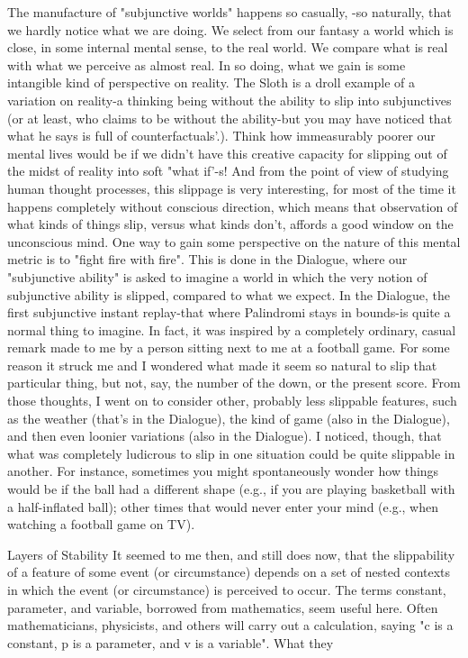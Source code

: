         The manufacture of "subjunctive worlds" happens so casually, -so naturally, that
we hardly notice what we are doing. We select from our fantasy a world which is close,
in some internal mental sense, to the real world. We compare what is real with what we
perceive as almost real. In so doing, what we gain is some intangible kind of perspective
on reality. The Sloth is a droll example of a variation on reality-a thinking being without
the ability to slip into subjunctives (or at least, who claims to be without the ability-but
you may have noticed that what he says is full of counterfactuals'.). Think how
immeasurably poorer our mental lives would be if we didn't have this creative capacity
for slipping out of the midst of reality into soft "what if'-s! And from the point of view of
studying human thought processes, this slippage is very interesting, for most of the time it
happens completely without conscious direction, which means that observation of what
kinds of things slip, versus what kinds don't, affords a good window on the unconscious
mind.
        One way to gain some perspective on the nature of this mental metric is to "fight
fire with fire". This is done in the Dialogue, where our "subjunctive ability" is asked to
imagine a world in which the very notion of
subjunctive ability is slipped, compared to what we expect. In the Dialogue, the first
subjunctive instant replay-that where Palindromi stays in bounds-is quite a normal thing
to imagine. In fact, it was inspired by a completely ordinary, casual remark made to me
by a person sitting next to me at a football game. For some reason it struck me and I
wondered what made it seem so natural to slip that particular thing, but not, say, the
number of the down, or the present score. From those thoughts, I went on to consider
other, probably less slippable features, such as the weather (that's in the Dialogue), the
kind of game (also in the Dialogue), and then even loonier variations (also in the
Dialogue). I noticed, though, that what was completely ludicrous to slip in one situation
could be quite slippable in another. For instance, sometimes you might spontaneously
wonder how things would be if the ball had a different shape (e.g., if you are playing
basketball with a half-inflated ball); other times that would never enter your mind (e.g.,
when watching a football game on TV).

Layers of Stability
It seemed to me then, and still does now, that the slippability of a feature of some event
(or circumstance) depends on a set of nested contexts in which the event (or
circumstance) is perceived to occur. The terms constant, parameter, and variable,
borrowed from mathematics, seem useful here. Often mathematicians, physicists, and
others will carry out a calculation, saying "c is a constant, p is a parameter, and v is a
variable". What they




